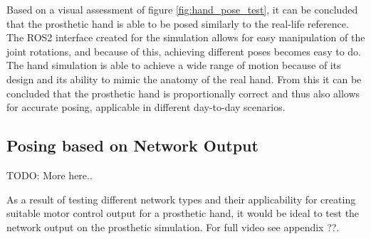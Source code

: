 \documentclass[../main.tex]{subfiles}
\begin{document}
Based on a visual assessment of figure \ref{fig:hand_pose_test}, it can be concluded that the prosthetic hand is able to be posed similarly to the real-life reference.
The ROS2 interface created for the simulation allows for easy manipulation of the joint rotations, and because of this, achieving different poses becomes easy to do.
The hand simulation is able to achieve a wide range of motion because of its design and its ability to mimic the anatomy of the real hand.
From this it can be concluded that the prosthetic hand is proportionally correct and thus also allows for accurate posing, applicable in different day-to-day scenarios.

\subsection{Posing based on Network Output}

TODO: More here..

As a result of testing different network types and their applicability for creating suitable motor control output for a prosthetic hand, it would be ideal to test the network output on the prosthetic simulation.
For full video see appendix ??.






\end{document}
